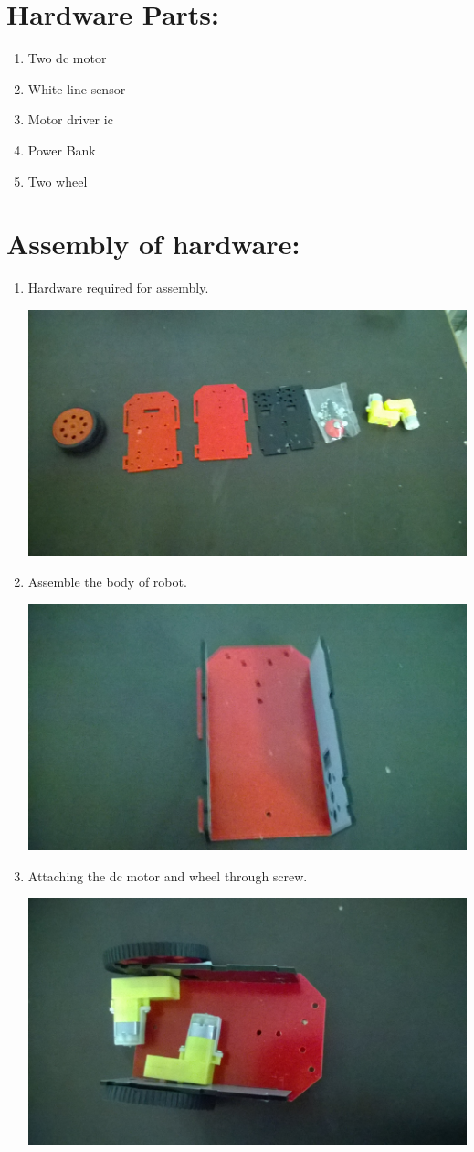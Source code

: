 \documentclass[a4paper,12pt,oneside]{book}
\begin{document}
\section{Hardware Parts:}
\begin{enumerate}
\item Two dc motor
\item White line sensor
\item Motor driver ic
\item Power Bank
\item Two wheel
\end{enumerate}
\section{Assembly of hardware:}
\begin{enumerate}
\item Hardware required for assembly.

\includegraphics[width=400 px]{hardware.jpg}

\item Assemble the body of robot.

\includegraphics[width=400 px]{chassey.jpg}

\item Attaching the dc motor and wheel through screw.

\includegraphics[width=400 px]{attaching_dc_motor.jpg}


\end{enumerate}
\end{document}
